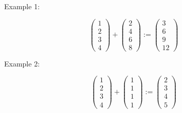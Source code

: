 \begin{frame}

    Example 1:

    \begin{equation*}
        \left(
        \begin{array}{c}
            1 \\
            2 \\
            3 \\
            4
        \end{array}
        \right)
        +
        \left(
        \begin{array}{c}
             2 \\
             4 \\
             6 \\
             8
        \end{array}
        \right)
        :=
        \left(
        \begin{array}{c}
            3 \\
            6 \\
            9 \\
            12
        \end{array}
        \right)
    \end{equation*}

    Example 2:

    \begin{equation*}
        \left(
        \begin{array}{c}
            1 \\
            2 \\
            3 \\
            4
        \end{array}
        \right)
        +
        \left(
        \begin{array}{c}
             1 \\
             1 \\
             1 \\
             1
        \end{array}
        \right)
        :=
        \left(
        \begin{array}{c}
            2 \\
            3 \\
            4 \\
            5
        \end{array}
        \right)
    \end{equation*}
    
\end{frame}

